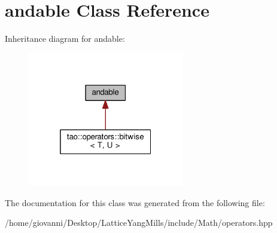 \hypertarget{classandable}{}\section{andable Class Reference}
\label{classandable}


Inheritance diagram for andable\+:\nopagebreak
\begin{figure}[H]
\begin{center}
\leavevmode
\includegraphics[width=193pt]{classandable__inherit__graph}
\end{center}
\end{figure}


The documentation for this class was generated from the following file\+:\begin{DoxyCompactItemize}
\item 
/home/giovanni/\+Desktop/\+Lattice\+Yang\+Mills/include/\+Math/operators.\+hpp\end{DoxyCompactItemize}
